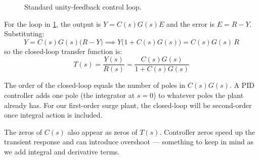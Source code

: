 \documentclass[../../book.tex]{subfiles}
\begin{document}
\begin{figure}[htbp]
\centering
{}
\caption{Standard unity-feedback control loop.}
\label{fig:unity_feedback}
\end{figure}

For the loop in \cref{fig:unity_feedback}, the output is $Y = C(s)G(s)E$ and
the error is $E = R - Y$.  Substituting:
\[
  Y = C(s)G(s)\bigl(R - Y\bigr)
  \implies Y\bigl(1 + C(s)G(s)\bigr) = C(s)G(s)\,R
\]
so the closed-loop transfer function is:
\begin{equation}
  T(s) = \frac{Y(s)}{R(s)} = \frac{C(s)G(s)}{1 + C(s)G(s)}
  \label{eq:cltf}
\end{equation}

The order of the closed-loop equals the number of poles in $C(s)G(s)$.  A PID
controller adds one pole (the integrator at $s=0$) to whatever poles the plant
already has.  For our first-order surge plant, the closed-loop will be
second-order once integral action is included.

The zeros of $C(s)$ also appear as zeros of $T(s)$.  Controller zeros speed up
the transient response and can introduce overshoot --- something to keep in mind
as we add integral and derivative terms.


\end{document}
